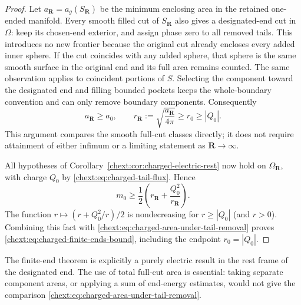 \begin{proof}
Let $a_{\mathbf R}=a_g(S_{\mathbf R})$ be the minimum enclosing
area in the retained one-ended manifold.  Every smooth filled cut
of $S_{\mathbf R}$ also gives a designated-end cut in $\Omega$:
keep its chosen-end exterior, and assign phase zero to all removed
tails.  This introduces no new frontier because the original cut
already encloses every added inner sphere.  If the cut coincides
with any added sphere, that sphere is the same smooth surface in
the original end and its full area remains counted.  The same
observation applies to coincident portions of $S$.  Selecting the
component toward the designated end and filling bounded pockets
keeps the whole-boundary convention and can only remove boundary
components.  Consequently
\begin{equation}\label{chext:eq:charged-area-under-tail-removal}
 a_{\mathbf R}\ge a_0,
 \qquad
 r_{\mathbf R}:=\sqrt{\frac{a_{\mathbf R}}{4\pi}}
       \ge r_0\ge|Q_0|.
\end{equation}
This argument compares the smooth full-cut classes directly; it
does not require attainment of either infimum or a limiting
statement as $\mathbf R\to\infty$.

All hypotheses of Corollary~\ref{chext:cor:charged-electric-rest} now hold
on $\Omega_{\mathbf R}$, with charge $Q_0$ by
\eqref{chext:eq:charged-tail-flux}.  Hence
\[
 m_0\ge\frac12\left(r_{\mathbf R}
                        +\frac{Q_0^2}{r_{\mathbf R}}\right).
\]
The function $r\mapsto(r+Q_0^2/r)/2$ is nondecreasing for
$r\ge|Q_0|$ (and $r>0$).  Combining this fact with
\eqref{chext:eq:charged-area-under-tail-removal} proves
\eqref{chext:eq:charged-finite-ends-bound}, including the endpoint
$r_0=|Q_0|$.
\end{proof}

The finite-end theorem is explicitly a purely electric result in the
rest frame of the designated end.  The use of total full-cut area
is essential: taking separate component areas, or applying a sum
of end-energy estimates, would not give the comparison
\eqref{chext:eq:charged-area-under-tail-removal}.
